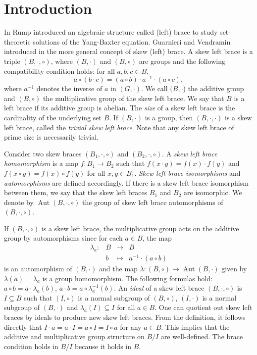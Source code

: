 \documentclass[12pt]{article}
\theoremstyle{definition}
\newcommand{\Aut}{\operatorname{Aut}}
\begin{document}
	
	\section{Introduction}
	In \cite{R07} Rump introduced an algebraic structure called (left) brace to study
	set-theoretic solutions of the Yang-Baxter equation. Guarnieri and Vendramin introduced in \cite{GV} the more general concept of skew (left) brace. A skew left brace is a 
    triple  $(B,\cdot,\circ)$, where  $(B,\cdot)$ and  $(B,\circ)$  are groups and the following compatibility condition holds:
    for all $a, b, c \in B$,
	$$a\circ(b\cdot c) = (a\circ b)\cdot a^{-1} \cdot (a\circ c),$$
	 where $a^{-1}$ denotes the inverse of $a$ in $(G,\cdot)$. We call $(B, \cdot$) the additive group and $(B, \circ)$ the multiplicative group of the skew left brace. We say that $B$ is a left brace if its additive group is abelian. The \textit{size} of a skew left brace is the cardinality of the underlying set $B$. If $(B,\cdot)$ is a group, then $(B,\cdot,\cdot)$ is a skew left brace, called the \textit{trivial skew left brace}. Note that any skew left brace of prime size is necessarily trivial.


Consider two skew braces $(B_1,\cdot,\circ)$ and $(B_2,\cdot,\circ)$. A \textit{skew left brace homomorphism} is a map $f : B_1 \to B_2$  such that $f(x\cdot y) = f(x)\cdot f(y)$ and $f(x\circ y) = f(x)\circ f(y)$ for all $x,y \in B_1$. \textit{Skew left brace isomorphisms} and \textit{automorphisms} are defined accordingly. If there is a skew left brace isomorphism between them, we say that the skew left braces $B_1$ and $B_2$ are isomorphic. We denote by $\Aut(B,\cdot,\circ)$  the group of skew left brace automorphisms of $(B,\cdot,\circ)$.

If $(B,\cdot,\circ)$ is a skew left brace, the multiplicative group acts on the additive group by
automorphisms since for each $a \in B$, the map
	$$\begin{array}{llll} \lambda_a: &B &\rightarrow &B
	\\ & b& \mapsto & a^{-1}\cdot (a\circ b) \end{array}$$
	is an automorphism of $(B,\cdot)$ and  the map  
    $\lambda: (B,\circ)\to \Aut(B,\cdot)$ given by $\lambda(a)=\lambda_a$ is a group homomorphism. The following formulas hold:  $a\circ b=a \cdot\lambda_a(b)$, $a\cdot b=a \circ\lambda_a^{-1}(b)$. An \textit{ideal} of a skew left brace $(B,\cdot,\circ)$ is $I\subseteq B$ such that $(I,\circ)$ is a normal subgroup of $(B,\circ)$, $(I,\cdot)$ is a normal subgroup of $(B,\cdot)$ and $\lambda_a(I)\subseteq I$ for all $a\in B$.
    One can quotient out skew left braces by ideals to produce new skew left braces. From the definition, it follows directly that 
    $I\cdot a= a\cdot I= a\circ I= I\circ a$
for any $a \in B$. This implies that the additive and multiplicative group structure on $B/I$ are
well-defined. The brace condition  holds in $B/I$ because it holds in $B$.
\end{document}
